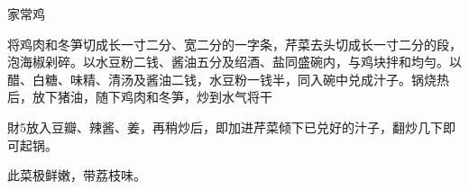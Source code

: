 \begin{recipe}{家常鸡}

\ingredients


\cooking

将鸡肉和冬笋切成长一寸二分、宽二分的一字条，芹菜去头切成长一寸二分的段，泡海椒剁碎。以水豆粉二钱、酱油五分及绍酒、盐同盛碗内，与鸡块拌和均勻。以醋、白糖、味精、清汤及酱油二钱，水豆粉一钱半，同入碗中兑成汁子。锅烧热后，放下猪油，随下鸡肉和冬笋，炒到水气将干

財5放入豆瓣、辣酱、姜，再稍炒后，即加进芹菜倾下已兑好的汁子，翻炒几下即可起锅。

\notes

此菜极鲜嫩，带荔枝味。

\end{recipe}

